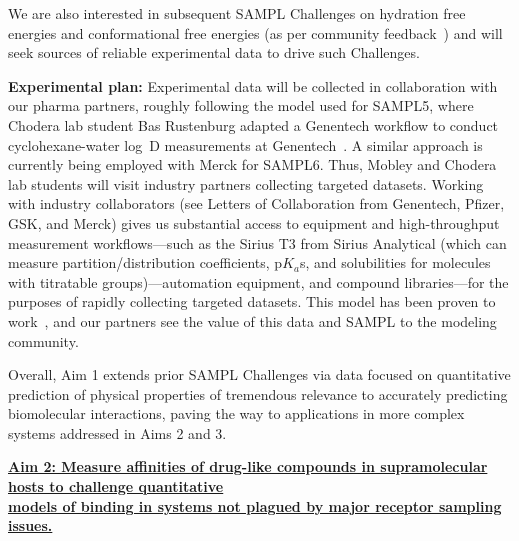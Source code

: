 \documentclass[11pt]{article}
\begin{document}
We are also interested in subsequent SAMPL Challenges on hydration free energies and conformational free energies (as per community feedback~\cite{Mobley:2017:eScholarship}) and will seek sources of reliable experimental data to drive such Challenges.

  
{\bf Experimental plan:}
Experimental data will be collected in collaboration with our pharma partners, roughly following the model used for SAMPL5, where Chodera lab student Bas Rustenburg adapted a Genentech workflow to conduct cyclohexane-water log~D measurements at Genentech~\cite{rustenburg_measuring_2016}.
A similar approach is currently being employed with Merck for SAMPL6.
Thus, Mobley and Chodera lab students will visit industry partners collecting targeted datasets.
Working with industry collaborators (see Letters of Collaboration from Genentech, Pfizer, GSK, and Merck) gives us substantial access to equipment and high-throughput measurement workflows---such as the Sirius T3 from Sirius Analytical (which can measure partition/distribution coefficients, p$K_a$s, and solubilities for molecules with titratable groups)---automation equipment, and compound libraries---for the purposes of rapidly collecting targeted datasets.
This model has been proven to work~\cite{rustenburg_measuring_2016}, and our partners see the value of this data and SAMPL to the modeling community.

Overall, Aim 1 extends prior SAMPL Challenges via data focused on quantitative prediction of physical properties of tremendous relevance to accurately predicting biomolecular interactions, paving the way to applications in more complex systems addressed in Aims 2 and 3.


\textbf{\underline{Aim 2: Measure affinities of drug-like compounds in supramolecular hosts to challenge quantitative}}\\
\textbf{\underline{models of binding in systems not plagued by major receptor sampling issues.}}
\end{document}
